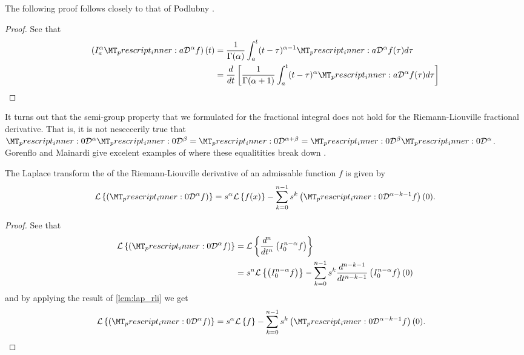 The following proof follows closely to that of Podlubny \cite{Podlubny1999}.
\begin{proof}
    See that
    \begin{align}
        \left(I_a^\alpha \prescript{}{a}{\mathcal{D}}^\alpha f\right)(t) &= \frac{1}{\Gamma(\alpha)} \int_a^t (t-\tau)^{\alpha - 1} \prescript{}{a}{\mathcal{D}}^\alpha f(\tau)d\tau \\
    &= \frac{d}{dt} \left[ \frac{1}{\Gamma(\alpha + 1)} \int_a^t (t-\tau)^\alpha \prescript{}{a}{\mathcal{D}}^\alpha f(\tau) d\tau\right]
    \end{align}
\end{proof}
It turns out that the semi-group property that we formulated for the fractional integral does not hold for the Riemann-Liouville fractional derivative.
That is, it is not neseccerily true that $ \prescript{}{0}{\mathcal{D}}^\alpha \prescript{}{0}{\mathcal{D}}^\beta =  \prescript{}{0}{\mathcal{D}}^{\alpha + \beta} =  \prescript{}{0}{\mathcal{D}}^\beta  \prescript{}{0}{\mathcal{D}}^\alpha $. Gorenflo and Mainardi give excelent examples of where these equalitities break down \cite{Gorenflo1997}.

\begin{lemma}
\label{lem:lap_rld}
	The Laplace transform the of the Riemann-Liouville derivative of an admissable function $ f $ is given by
	\begin{align}
		\mathcal{L} \left\{ \rld{0}{}{\alpha}{f} \right\} = s^\alpha \mathcal{L} \left\{ f(x) \right\} - \sum_{k=0}^{n-1} s^{k} \rld{0}{}{\alpha-k-1}{f}(0).
	\end{align}
\end{lemma}
\begin{proof}
	See that
	\begin{align}
		\laplace{ \rld{0}{}{\alpha}{f} } &= \laplace{ \der{}{t}{n} \rli{0}{n-\alpha}{f} } \\
		&= s^n\laplace{\rli{0}{n-\alpha}{f}} - \sum_{k=0}^{n-1} s^k \der{}{t}{n-k-1} \rli{0}{n-\alpha}{f}(0)
	\end{align}
	and by applying the result of \ref{lem:lap_rli} we get
	\begin{align}
			\mathcal{L} \left\{\rld{0}{}{\alpha}{f} \right\} &= s^\alpha \laplace{f} - \sum_{k=0}^{n-1} s^{k} \rld{0}{}{\alpha - k - 1}{f}(0). 
	\end{align}
    
\end{proof}

